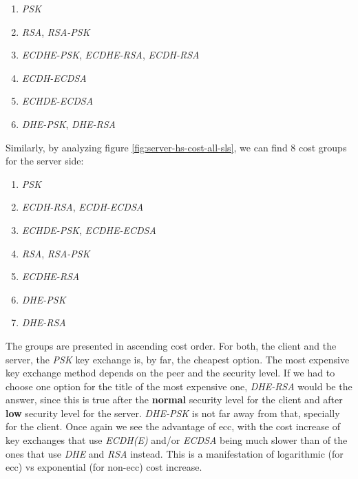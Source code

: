 \documentclass{llncs}
\begin{document}
\begin{enumerate}
  \item \textit{PSK}
  \item \textit{RSA}, \textit{RSA-PSK}
  \item \textit{ECDHE-PSK}, \textit{ECDHE-RSA}, \textit{ECDH-RSA}
  \item \textit{ECDH-ECDSA}
  \item \textit{ECHDE-ECDSA}
  \item \textit{DHE-PSK}, \textit{DHE-RSA}
\end{enumerate}

Similarly, by analyzing figure \ref{fig:server-hs-cost-all-sls}, we can find $8$ cost groups for the server side:

\begin{enumerate}
  \item \textit{PSK}
  \item \textit{ECDH-RSA}, \textit{ECDH-ECDSA}
  \item \textit{ECHDE-PSK}, \textit{ECDHE-ECDSA}
  \item \textit{RSA}, \textit{RSA-PSK}
  \item \textit{ECDHE-RSA}
  \item \textit{DHE-PSK}
  \item \textit{DHE-RSA}
\end{enumerate}

The groups are presented in ascending cost order. For both, the client and the server, the \textit{PSK} key exchange is, by far,
the cheapest option. The most expensive key exchange method depends on the peer and the security level. If we had to choose one
option for the title of the most expensive one, \textit{DHE-RSA} would be the answer, since this is true after the
\textbf{normal} security level for the client and after \textbf{low} security level for the server. \textit{DHE-PSK} is not
far away from that, specially for the client. Once again we see the advantage of \gls{ecc}, with the cost increase of
key exchanges that use \textit{ECDH(E)} and/or \textit{ECDSA} being much slower than of the ones that use \textit{DHE} and \textit{RSA}
instead. This is a manifestation of logarithmic (for \gls{ecc}) vs exponential (for non-\gls{ecc}) cost increase.
\end{document}
